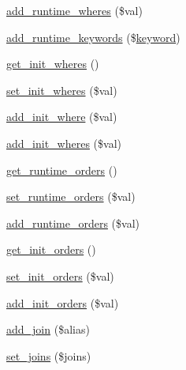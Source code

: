 \begin{DoxyCompactItemize}
\item 
\hyperlink{classep___dataset_a79d537a1e4cbaac89d78ef4dd873d0a2}{add\-\_\-runtime\-\_\-wheres} (\$val)
\item 
\hyperlink{classep___dataset_ac807364473f967e688069c86c28ce38b}{add\-\_\-runtime\-\_\-keywords} (\$\hyperlink{classep___dataset_aa3ade294e9edd356f3a8584ec43658e7}{keyword})
\item 
\hyperlink{classep___dataset_ab3d25be1e3f5ae02359da9d8a25a3cf9}{get\-\_\-init\-\_\-wheres} ()
\item 
\hyperlink{classep___dataset_acdf1110477f0d3c61b9f3c302e510ca9}{set\-\_\-init\-\_\-wheres} (\$val)
\item 
\hyperlink{classep___dataset_aa46068ffadc47260874614e96ec4d5e0}{add\-\_\-init\-\_\-where} (\$val)
\item 
\hyperlink{classep___dataset_ad063c2f26ee29a2c05a2af161dbd2223}{add\-\_\-init\-\_\-wheres} (\$val)
\item 
\hyperlink{classep___dataset_abb0321e4b97f9f313244d7306a90fe2e}{get\-\_\-runtime\-\_\-orders} ()
\item 
\hyperlink{classep___dataset_a988f53c5e42b3a6616b126c5e963ac73}{set\-\_\-runtime\-\_\-orders} (\$val)
\item 
\hyperlink{classep___dataset_a682208bcd2d31f564f29725ff6506942}{add\-\_\-runtime\-\_\-orders} (\$val)
\item 
\hyperlink{classep___dataset_a0aa0fc386c95e829c26ffd4081e9b746}{get\-\_\-init\-\_\-orders} ()
\item 
\hyperlink{classep___dataset_aee698a8bc6837880bc59d85af6f6bbd6}{set\-\_\-init\-\_\-orders} (\$val)
\item 
\hyperlink{classep___dataset_a4fb25086f5f699e7e33ee3454cbfc4de}{add\-\_\-init\-\_\-orders} (\$val)
\item 
\hyperlink{classep___dataset_a8ea26f0aaf413fdc15c46ebb209d5294}{add\-\_\-join} (\$alias)
\item 
\hyperlink{classep___dataset_a2ef7bfb715e2747ab93c9f3b8c62adb3}{set\-\_\-joins} (\$joins)
\end{DoxyCompactItemize}

